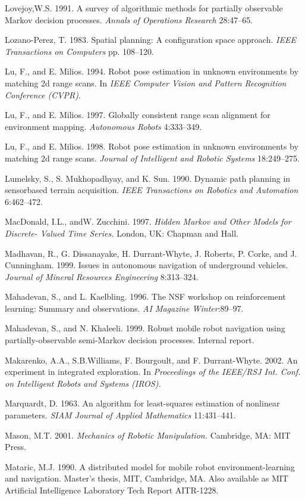 \documentclass[10pt,a4paper]{article}
\begin{document}
Lovejoy,W.S. 1991. A survey of algorithmic methods for partially observable Markov
decision processes. \textit{Annals of Operations Research} 28:47–65.

Lozano-Perez, T. 1983. Spatial planning: A configuration space approach. \textit{IEEE
Transactions on Computers} pp. 108–120.

Lu, F., and E. Milios. 1994. Robot pose estimation in unknown environments by
matching 2d range scans. In \textit{IEEE Computer Vision and Pattern Recognition Conference
(CVPR)}.

Lu, F., and E. Milios. 1997. Globally consistent range scan alignment for environment
mapping. \textit{Autonomous Robots} 4:333–349.

Lu, F., and E. Milios. 1998. Robot pose estimation in unknown environments by
matching 2d range scans. \textit{Journal of Intelligent and Robotic Systems} 18:249–275.

Lumelsky, S., S. Mukhopadhyay, and K. Sun. 1990. Dynamic path planning in sensorbased
terrain acquisition. \textit{IEEE Transactions on Robotics and Automation} 6:462–472.

MacDonald, I.L., andW. Zucchini. 1997. \textit{Hidden Markov and Other Models for Discrete-
Valued Time Series. }London, UK: Chapman and Hall.

Madhavan, R., G. Dissanayake, H. Durrant-Whyte, J. Roberts, P. Corke, and J. Cunningham.
1999. Issues in autonomous navigation of underground vehicles. \textit{Journal
of Mineral Resources Engineering} 8:313–324.

Mahadevan, S., and L. Kaelbling. 1996. The NSF workshop on reinforcement learning:
Summary and observations. \textit{AI Magazine Winter}:89–97.

Mahadevan, S., and N. Khaleeli. 1999. Robust mobile robot navigation using
partially-observable semi-Markov decision processes. Internal report.

Makarenko, A.A., S.B.Williams, F. Bourgoult, and F. Durrant-Whyte. 2002. An experiment
in integrated exploration. In \textit{Proceedings of the IEEE/RSJ Int. Conf. on Intelligent
Robots and Systems (IROS).}

Marquardt, D. 1963. An algorithm for least-squares estimation of nonlinear parameters.
\textit{SIAM Journal of Applied Mathematics} 11:431–441.

Mason, M.T. 2001. \textit{Mechanics of Robotic Manipulation.} Cambridge, MA: MIT Press.

Mataric, M.J. 1990. A distributed model for mobile robot environment-learning and
navigation. Master’s thesis, MIT, Cambridge, MA. Also available as MIT Artificial
Intelligence Laboratory Tech Report AITR-1228.
\end{document}
